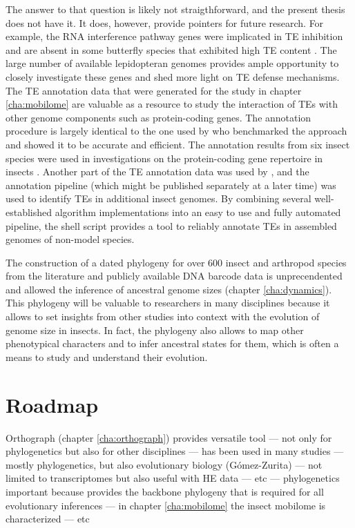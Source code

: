 The answer to that question is likely not straigthforward, and the
present thesis does not have it. It does, however, provide pointers for
future research. For example, the RNA interference pathway genes were
implicated in TE inhibition \citep{Aravin2001,Czech2008} and are absent
in some butterfly species that exhibited high TE content
\citep{Dowling2017}.  The large number of available lepidopteran genomes
provides ample opportunity to closely investigate these genes and shed
more light on TE defense mechanisms.  The TE annotation data that were
generated for the study in chapter \ref{cha:mobilome} are valuable as a
resource to study the interaction of TEs with other genome components
such as protein-coding genes. The annotation procedure is largely
identical to the one used by \citet{Reinar2016} who benchmarked the
approach and showed it to be accurate and efficient. The annotation
results from six insect species  were
used in investigations on the protein-coding gene repertoire in insects
. Another part of the TE annotation data was
used by \citep{Provataris2018}, and the annotation pipeline (which might
be published separately at a later time) was used to identify TEs in
additional insect genomes. By combining several well-established
algorithm implementations into an easy to use and fully automated
pipeline, the shell script provides a tool to reliably annotate TEs in
assembled genomes of non-model species. 

The construction of a dated phylogeny for over 600 insect and arthropod
species from the literature and publicly available DNA barcode data is
unprecendented and allowed the inference of ancestral genome sizes
(chapter \ref{cha:dynamics}). This phylogeny will be valuable to
researchers in many disciplines because it allows to set insights from
other studies into context with the evolution of genome size in insects.
In fact, the phylogeny also allows to map other phenotypical characters
and to infer ancestral states for them, which is often a means to study
and understand their evolution.

\section{Roadmap}

Orthograph (chapter \ref{cha:orthograph}) provides versatile tool ---
not only for phylogenetics but also for other disciplines --- has been
used in many studies --- mostly phylogenetics, but also evolutionary
biology (Gómez-Zurita) --- not limited to transcriptomes but also useful
with HE data --- etc --- phylogenetics important because provides the
backbone phylogeny that is required for all evolutionary inferences ---
in chapter \ref{cha:mobilome} the insect mobilome is characterized ---
etc
